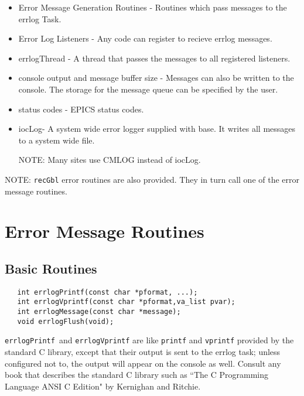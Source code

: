 \begin{itemize}\item Error Message Generation Routines - Routines which pass messages to the errlog Task.

\item Error Log Listeners - Any code can register to recieve errlog messages.

\item errlogThread - A thread that passes the messages to all registered listeners.

\item console output and message buffer size - Messages can also be written to the console. The storage for the message 
queue can be specified by the user.

\item status codes - EPICS status codes.

\item iocLog- A system wide error logger supplied with base. It writes all messages to a system wide file.

NOTE: Many sites use CMLOG instead of iocLog.

\end{itemize}NOTE: \verb|recGbl| error routines are also provided. They in turn call one of the error message routines.

\section{Error Message Routines}

\subsection{Basic Routines}

\begin{verbatim}
   int errlogPrintf(const char *pformat, ...);
   int errlogVprintf(const char *pformat,va_list pvar);
   int errlogMessage(const char *message);
   void errlogFlush(void);
\end{verbatim}
 \verb|errlogPrintf |and  \verb|errlogVprintf| are like \verb|printf| and \verb|vprintf| provided by the standard C library, except 
that their output is sent to the errlog task; unless configured not to, the output will appear on the console as well. Consult 
any book that describes the standard C library such as ``The C Programming Language ANSI C Edition" by Kernighan 
and Ritchie.

